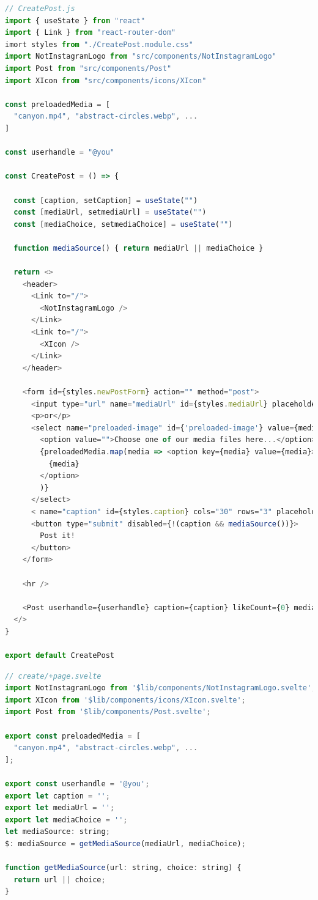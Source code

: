 \documentclass[a4paper, 10pt]{article}
\begin{document}
\begin{lstlisting}[caption=Create in React, label={lst:React:Create}, language=JavaScript]
// CreatePost.js
import { useState } from "react"
import { Link } from "react-router-dom"
imort styles from "./CreatePost.module.css"
import NotInstagramLogo from "src/components/NotInstagramLogo"
import Post from "src/components/Post"
import XIcon from "src/components/icons/XIcon"

const preloadedMedia = [
  "canyon.mp4", "abstract-circles.webp", ...
]

const userhandle = "@you"

const CreatePost = () => {

  const [caption, setCaption] = useState("")
  const [mediaUrl, setmediaUrl] = useState("")
  const [mediaChoice, setmediaChoice] = useState("")

  function mediaSource() { return mediaUrl || mediaChoice }

  return <>
    <header>
      <Link to="/">
        <NotInstagramLogo />
      </Link>
      <Link to="/">
        <XIcon />
      </Link>
    </header>

    <form id={styles.newPostForm} action="" method="post">
      <input type="url" name="mediaUrl" id={styles.mediaUrl} placeholder="Insert your media URL here..." value={mediaUrl} onChange={(event) => setmediaUrl(event.target.value)} />
      <p>or</p>
      <select name="preloaded-image" id={'preloaded-image'} value={mediaChoice} onChange={(event) => setmediaChoice(event.target.value)}>
        <option value="">Choose one of our media files here...</option>
        {preloadedMedia.map(media => <option key={media} value={media}>
          {media}
        </option>
        )}
      </select>
      < name="caption" id={styles.caption} cols="30" rows="3" placeholder="Type your caption here" value={caption} onChange={(event) => setCaption(event.target.value)} />
      <button type="submit" disabled={!(caption && mediaSource())}>
        Post it!
      </button>
    </form>

    <hr />

    <Post userhandle={userhandle} caption={caption} likeCount={0} mediaSource={mediaSource()} hideActionIcons={true} />
  </>
}

export default CreatePost
\end{lstlisting}

\begin{lstlisting}[caption=Create in Svelte (Script), label={lst:Svelte:Create:Script}, language=JavaScript]
// create/+page.svelte
import NotInstagramLogo from '$lib/components/NotInstagramLogo.svelte';
import XIcon from '$lib/components/icons/XIcon.svelte';
import Post from '$lib/components/Post.svelte';

export const preloadedMedia = [
  "canyon.mp4", "abstract-circles.webp", ...
];

export const userhandle = '@you';
export let caption = '';
export let mediaUrl = '';
export let mediaChoice = '';
let mediaSource: string;
$: mediaSource = getMediaSource(mediaUrl, mediaChoice);

function getMediaSource(url: string, choice: string) {
  return url || choice;
}
\end{lstlisting}
\end{document}
